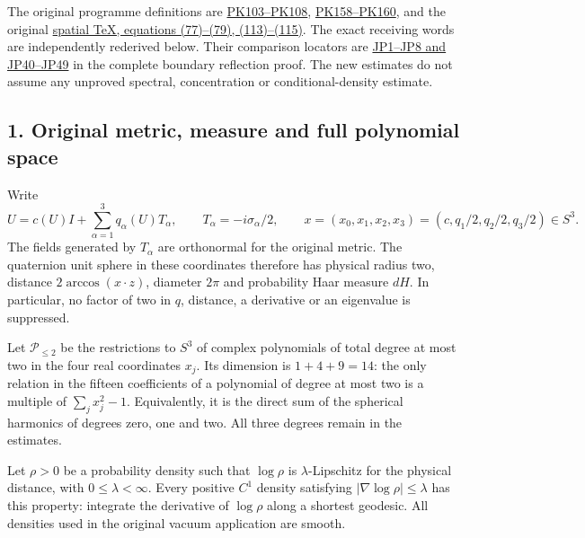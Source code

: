 \documentclass[11pt]{article}
\begin{document}
The original programme definitions are
\href{https://github.com/KokunoYumeto/yang-mills-interacting-workbench/blob/485b61423c1f4e1805deb453c1b6b342b27842b6/yang-mills/continuations/20260930-s6-ns-moment-map-bridge/PERIOD_COUPLING_AND_PHYSICAL_KERNELS.md#L2440}{PK103–PK108},
\href{https://github.com/KokunoYumeto/yang-mills-interacting-workbench/blob/485b61423c1f4e1805deb453c1b6b342b27842b6/yang-mills/continuations/20260930-s6-ns-moment-map-bridge/PERIOD_COUPLING_AND_PHYSICAL_KERNELS.md#L3500}{PK158–PK160},
and the original
\href{https://github.com/KokunoYumeto/yang-mills-interacting-workbench/blob/485b61423c1f4e1805deb453c1b6b342b27842b6/yang-mills/continuations/20260930-s6-ns-moment-map-bridge/sources/spatial/spatial_continuum.tex#L1415}{spatial TeX, equations (77)–(79), (113)–(115)}.
The exact receiving words are independently rederived below. Their
comparison locators are \href{https://github.com/KokunoYumeto/yang-mills-interacting-workbench/blob/main/yang-mills/continuations/20261011-central-signs-shrinking-window/BOUNDARY_REFLECTION_AND_RAW_ENDPOINT.md}{JP1–JP8 and JP40–JP49} in the complete boundary reflection proof. The new
estimates do not assume any unproved spectral, concentration or
conditional-density estimate.

\subsection*{1. Original metric, measure and full polynomial space}

Write
\[
 U=c(U)I+\sum_{\alpha=1}^3q_\alpha(U)T_\alpha,\qquad
 T_\alpha=-i\sigma_\alpha/2,\qquad
 x=(x_0,x_1,x_2,x_3)=(c,q_1/2,q_2/2,q_3/2)\in S^3.
 \tag{PS1}
\]
The fields generated by \(T_\alpha\) are orthonormal for the original
metric. The quaternion unit sphere in these coordinates therefore has
physical radius two, distance \(2\arccos(x\cdot z)\), diameter \(2\pi\)
and probability Haar measure \(dH\). In particular, no factor of two
in \(q\), distance, a derivative or an eigenvalue is suppressed.

Let \(\mathcal P_{\le2}\) be the restrictions to \(S^3\) of complex
polynomials of total degree at most two in the four real coordinates
\(x_j\). Its dimension is \(1+4+9=14\): the only relation in the
fifteen coefficients of a polynomial of degree at most two is a
multiple of \(\sum_jx_j^2-1\). Equivalently, it is the direct sum
of the spherical harmonics of degrees zero, one and two. All three
degrees remain in the estimates.

Let \(\rho>0\) be a probability density such that \(\log\rho\) is
\(\lambda\)-Lipschitz for the physical distance, with \(0\le\lambda<\infty\).
Every positive \(C^1\) density satisfying
\(\lvert\nabla\log\rho\rvert\le\lambda\) has this property: integrate
the derivative of \(\log\rho\) along a shortest geodesic. All densities
used in the original vacuum application are smooth.
\end{document}
